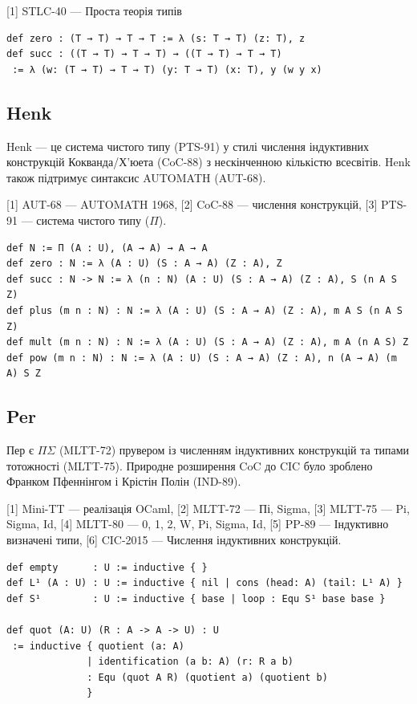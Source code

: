 [1] STLC-40 — Проста теорія типів

\begin{lstlisting}
def zero : (T → T) → T → T := λ (s: T → T) (z: T), z
def succ : ((T → T) → T → T) → ((T → T) → T → T)
 := λ (w: (T → T) → T → T) (y: T → T) (x: T), y (w y x)
\end{lstlisting}

\subsection*{Henk}

Henk — це система чистого типу (PTS-91) у стилі числення індуктивних
конструкцій Кокванда/Х’юета (CoC-88) з нескінченною кількістю всесвітів.
Henk також підтримує синтаксис AUTOMATH (AUT-68).

[1] AUT-68 — AUTOMATH 1968, [2] CoC-88 — числення конструкцій, [3] PTS-91 — система чистого типу ($\Pi$).

\begin{lstlisting}
def N := Π (A : U), (A → A) → A → A
def zero : N := λ (A : U) (S : A → A) (Z : A), Z
def succ : N -> N := λ (n : N) (A : U) (S : A → A) (Z : A), S (n A S Z)
def plus (m n : N) : N := λ (A : U) (S : A → A) (Z : A), m A S (n A S Z)
def mult (m n : N) : N := λ (A : U) (S : A → A) (Z : A), m A (n A S) Z
def pow (m n : N) : N := λ (A : U) (S : A → A) (Z : A), n (A → A) (m A) S Z
\end{lstlisting}

\subsection*{Per}

Пер є $\Pi\Sigma$ (MLTT-72) прувером із численням індуктивних конструкцій
та типами тотожності (MLTT-75). Природне розширення CoC до CIC було
зроблено Франком Пфеннінгом і Крістін Полін (IND-89).

[1] Mini-TT — реалізація OCaml,
[2] MLTT-72 — Пі, Sigma,
[3] MLTT-75 — Pi, Sigma, Id,
[4] MLTT-80 — 0, 1, 2, W, Pi, Sigma, Id,
[5] PP-89 — Індуктивно визначені типи,
[6] CIC-2015 — Числення індуктивних конструкцій.

\begin{lstlisting}
def empty      : U := inductive { }
def L¹ (A : U) : U := inductive { nil | cons (head: A) (tail: L¹ A) }
def S¹         : U := inductive { base | loop : Equ S¹ base base }

def quot (A: U) (R : A -> A -> U) : U
 := inductive { quotient (a: A)
              | identification (a b: A) (r: R a b)
              : Equ (quot A R) (quotient a) (quotient b)
              }
\end{lstlisting}

